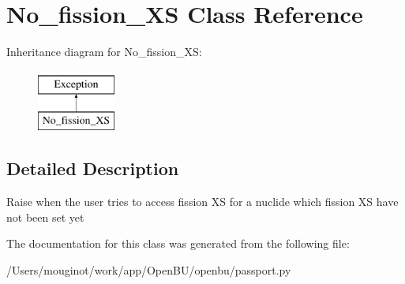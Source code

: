 \hypertarget{classopenbu_1_1passport_1_1_no__fission___x_s}{}\section{No\+\_\+fission\+\_\+\+XS Class Reference}
\label{classopenbu_1_1passport_1_1_no__fission___x_s}
Inheritance diagram for No\+\_\+fission\+\_\+\+XS\+:\begin{figure}[H]
\begin{center}
\leavevmode
\includegraphics[height=2.000000cm]{classopenbu_1_1passport_1_1_no__fission___x_s}
\end{center}
\end{figure}


\subsection{Detailed Description}
\begin{DoxyVerb}Raise when the user tries to access fission XS for a nuclide which fission XS have not been set yet \end{DoxyVerb}
 

The documentation for this class was generated from the following file\+:\begin{DoxyCompactItemize}
\item 
/\+Users/mouginot/work/app/\+Open\+B\+U/openbu/passport.\+py\end{DoxyCompactItemize}
